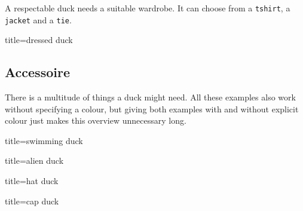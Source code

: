 \documentclass{ltxdockit}
\begin{document}
A respectable duck needs a suitable wardrobe. It can choose from a \texttt{tshirt}, a \texttt{jacket} and a \texttt{tie}.
\begin{tcblisting}{title={dressed duck}}
\begin{tikzpicture}
	\duck[tshirt]
\end{tikzpicture}
\begin{tikzpicture}
	\duck[jacket]
\end{tikzpicture}

\begin{tikzpicture}
	\duck[tie]
\end{tikzpicture}
\begin{tikzpicture}
	\duck[tshirt=lightgray, 
			jacket=blue!50!black, 
			tie=blue!80!black, 
			shorthair]
\end{tikzpicture}
\end{tcblisting}

\subsection{Accessoire}

There is a multitude of things a duck might need. All these examples also work without specifying a colour, but giving both examples with and without explicit colour just makes this overview unnecessary long.

\begin{tcblisting}{title={swimming duck}}
\begin{tikzpicture}
	\duck[water=cyan!50!blue]
\end{tikzpicture}
\end{tcblisting}

\begin{tcblisting}{title={alien duck}}
\begin{tikzpicture}
	\duck[alien=green!50!brown]
\end{tikzpicture}
\end{tcblisting}

\begin{tcblisting}{title={hat duck}}
\begin{tikzpicture}
	\duck[hat=red!50!black]
\end{tikzpicture}
\end{tcblisting}

\begin{tcblisting}{title={cap duck}}
\begin{tikzpicture}
	\duck[cap=red]
\end{tikzpicture}
\end{tcblisting}
\end{document}
